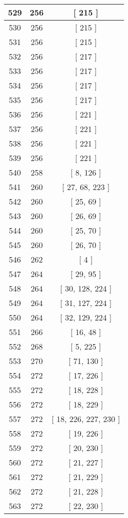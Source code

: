 \begin{center}
\begin{longtable}[H]{|| c c c ||}
\hline
529 & 256 & [ 215 ] \\ 
\hline
530 & 256 & [ 215 ] \\ 
\hline
531 & 256 & [ 215 ] \\ 
\hline
532 & 256 & [ 217 ] \\ 
\hline
533 & 256 & [ 217 ] \\ 
\hline
534 & 256 & [ 217 ] \\ 
\hline
535 & 256 & [ 217 ] \\ 
\hline
536 & 256 & [ 221 ] \\ 
\hline
537 & 256 & [ 221 ] \\ 
\hline
538 & 256 & [ 221 ] \\ 
\hline
539 & 256 & [ 221 ] \\ 
\hline
540 & 258 & [ 8, 126 ] \\ 
\hline
541 & 260 & [ 27, 68, 223 ] \\ 
\hline
542 & 260 & [ 25, 69 ] \\ 
\hline
543 & 260 & [ 26, 69 ] \\ 
\hline
544 & 260 & [ 25, 70 ] \\ 
\hline
545 & 260 & [ 26, 70 ] \\ 
\hline
546 & 262 & [ 4 ] \\ 
\hline
547 & 264 & [ 29, 95 ] \\ 
\hline
548 & 264 & [ 30, 128, 224 ] \\ 
\hline
549 & 264 & [ 31, 127, 224 ] \\ 
\hline
550 & 264 & [ 32, 129, 224 ] \\ 
\hline
551 & 266 & [ 16, 48 ] \\ 
\hline
552 & 268 & [ 5, 225 ] \\ 
\hline
553 & 270 & [ 71, 130 ] \\ 
\hline
554 & 272 & [ 17, 226 ] \\ 
\hline
555 & 272 & [ 18, 228 ] \\ 
\hline
556 & 272 & [ 18, 229 ] \\ 
\hline
557 & 272 & [ 18, 226, 227, 230 ] \\ 
\hline
558 & 272 & [ 19, 226 ] \\ 
\hline
559 & 272 & [ 20, 230 ] \\ 
\hline
560 & 272 & [ 21, 227 ] \\ 
\hline
561 & 272 & [ 21, 229 ] \\ 
\hline
562 & 272 & [ 21, 228 ] \\ 
\hline
563 & 272 & [ 22, 230 ] \\ 
\hline

\end{longtable}
\end{center}
